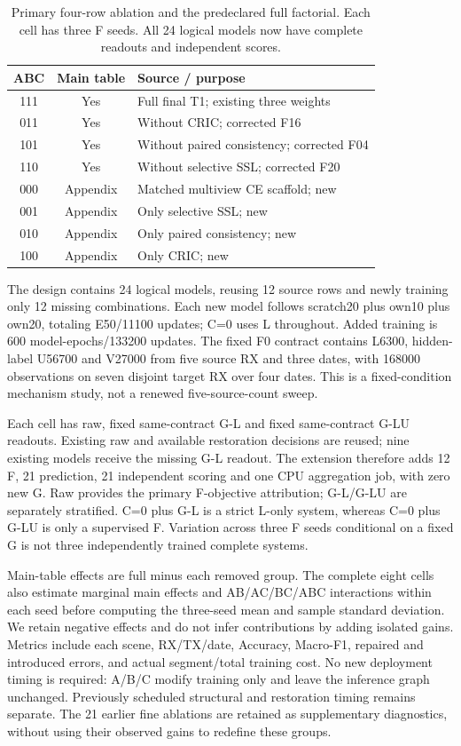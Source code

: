 \begin{table}[t]
\centering\footnotesize
\caption{Primary four-row ablation and the predeclared full factorial. Each cell has three F seeds. All 24 logical models now have complete readouts and independent scores.}
\label{tab:three-core-design}
\begin{tabular}{ccp{}}
\toprule
ABC & Main table & Source / purpose\\
\midrule
111 & Yes & Full final T1; existing three weights\\
011 & Yes & Without CRIC; corrected F16\\
101 & Yes & Without paired consistency; corrected F04\\
110 & Yes & Without selective SSL; corrected F20\\
\midrule
000 & Appendix & Matched multiview CE scaffold; new\\
001 & Appendix & Only selective SSL; new\\
010 & Appendix & Only paired consistency; new\\
100 & Appendix & Only CRIC; new\\
\bottomrule
\end{tabular}
\end{table}

The design contains 24 logical models, reusing 12 source rows and newly training only 12 missing combinations. Each new model follows scratch20 plus own10 plus own20, totaling E50/11100 updates; C=0 uses L throughout. Added training is 600 model-epochs/133200 updates. The fixed F0 contract contains L6300, hidden-label U56700 and V27000 from five source RX and three dates, with 168000 observations on seven disjoint target RX over four dates. This is a fixed-condition mechanism study, not a renewed five-source-count sweep.

Each cell has raw, fixed same-contract G-L and fixed same-contract G-LU readouts. Existing raw and available restoration decisions are reused; nine existing models receive the missing G-L readout. The extension therefore adds 12 F, 21 prediction, 21 independent scoring and one CPU aggregation job, with zero new G. Raw provides the primary F-objective attribution; G-L/G-LU are separately stratified. C=0 plus G-L is a strict L-only system, whereas C=0 plus G-LU is only a supervised F. Variation across three F seeds conditional on a fixed G is not three independently trained complete systems.

Main-table effects are full minus each removed group. The complete eight cells also estimate marginal main effects and AB/AC/BC/ABC interactions within each seed before computing the three-seed mean and sample standard deviation. We retain negative effects and do not infer contributions by adding isolated gains. Metrics include each scene, RX/TX/date, Accuracy, Macro-F1, repaired and introduced errors, and actual segment/total training cost. No new deployment timing is required: A/B/C modify training only and leave the inference graph unchanged. Previously scheduled structural and restoration timing remains separate. The 21 earlier fine ablations are retained as supplementary diagnostics, without using their observed gains to redefine these groups.
